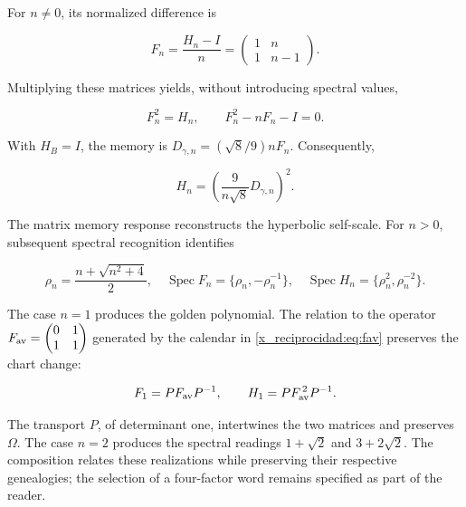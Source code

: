 For \(n\ne0\), its normalized difference is



\[
F_n=\frac{H_n-I}{n}
=\begin{pmatrix}1&n\\1&n-1\end{pmatrix}.
\]



Multiplying these matrices yields, without introducing spectral values,



\begin{equation}
\boxed{F_n^2=H_n,\qquad F_n^2-nF_n-I=0.}
\label{x_reciprocidad:nuc11:eq:29}
\end{equation}



With \(H_B=I\), the memory is
\(D_{\gamma,n}=(\sqrt8/9)nF_n\).
Consequently,



\begin{equation}
\boxed{H_n=\left(\frac9{n\sqrt8}D_{\gamma,n}\right)^2.}
\label{x_reciprocidad:nuc11:eq:30}
\end{equation}



The matrix memory response reconstructs the hyperbolic
self-scale. For \(n>0\), subsequent spectral recognition
identifies



\begin{equation}
\rho_n=\frac{n+\sqrt{n^2+4}}2,\quad
\operatorname{Spec}F_n=\{\rho_n,-\rho_n^{-1}\},\quad
\operatorname{Spec}H_n=\{\rho_n^2,\rho_n^{-2}\}.
\label{x_reciprocidad:nuc11:eq:31}
\end{equation}



The case \(n=1\) produces the golden polynomial. The relation to the operator \(F_{\rm av}=\begin{pmatrix}0&1\\1&1\end{pmatrix}\)
generated by the calendar in \eqref{x_reciprocidad:eq:fav} preserves the chart
change:



\begin{equation}
F_1=PF_{\rm av}P^{-1},\qquad
H_1=PF_{\rm av}^{\,2}P^{-1}.
\label{x_reciprocidad:nuc11:eq:32}
\end{equation}



The transport \(P\), of determinant one, intertwines the two matrices and preserves \(\Omega\). The case \(n=2\) produces the spectral readings \(1+\sqrt2\) and \(3+2\sqrt2\). The composition relates these realizations while preserving their respective genealogies; the selection of a four-factor word remains specified as part of the reader.

